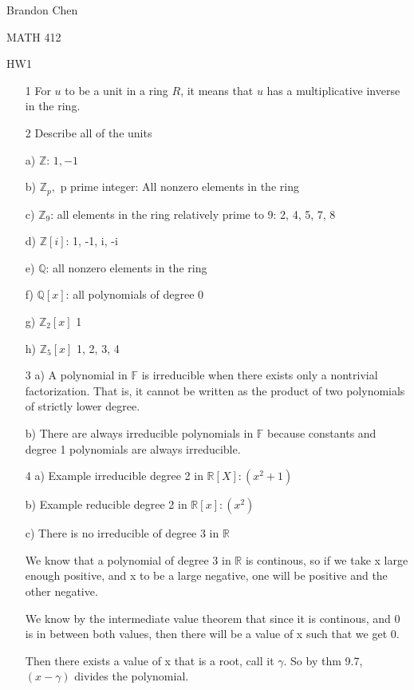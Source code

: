 \documentclass[12pt]{article}
\begin{document}
\noindent Brandon Chen

\noindent MATH 412

\noindent HW1

\begin{itemize}

\item[1]
  For $u$ to be a unit in a ring $R$, it means that $u$ has a multiplicative inverse in the ring.

\item[2]
  Describe all of the units

  a) $\mathbb{Z}$: $1, -1$

  b) $\mathbb{Z}_p,$ p prime integer: All nonzero elements in the ring

  c) $\mathbb{Z}_9$: all elements in the ring relatively prime to 9: 2, 4, 5, 7, 8

  d) $\mathbb{Z}[i]$: 1, -1, i, -i

  e) $\mathbb{Q}$: all nonzero elements in the ring

  f) $\mathbb{Q}[x]$: all polynomials of degree 0

  g) $\mathbb{Z}_2 [x]$ 1

  h) $\mathbb{Z}_5 [x]$ 1, 2, 3, 4
\item[3]
  a) A polynomial in $\mathbb{F}$ is irreducible when there exists only a nontrivial factorization. That is, it cannot be written as the product of two polynomials of strictly lower degree.

  b) There are always irreducible polynomials in $\mathbb{F}$ because constants and degree 1 polynomials are always irreducible.

\item[4]
  a) Example irreducible degree 2 in $\mathbb{R} [X] : (x^2 + 1)$

  b) Example reducible degree 2 in $\mathbb{R} [x]: (x^2)$

  c) There is no irreducible of degree 3 in $\mathbb{R}$

  We know that a polynomial of degree 3 in $\mathbb{R}$ is continous, so if we take x large enough positive, and x to be a large negative, one will be positive and the other negative.

  We know by the intermediate value theorem that since it is continous, and 0 is in between both values, then there will be a value of x such that we get 0.

  Then there exists a value of x that is a root, call it $\gamma$. So by thm 9.7, $(x-\gamma)$ divides the polynomial.


\end{itemize}
\end{document}
